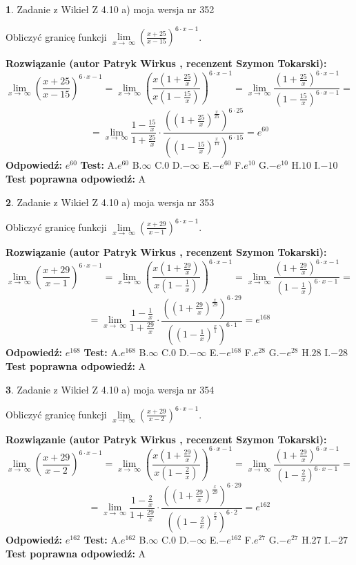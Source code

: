 \documentclass[12pt, a4paper]{article}
\theoremstyle{definition} %
\newtheorem{zad}{}
\newcommand{\zadStart}[1]{\begin{zad}#1\newline}
\newcommand{\zadStop}{\end{zad}}
\newcommand{\rozwStart}[2]{\noindent \textbf{Rozwiązanie (autor #1 , recenzent #2): }\newline}
\newcommand{\rozwStop}{\newline}
\newcommand{\odpStart}{\noindent \textbf{Odpowiedź:}\newline}
\newcommand{\odpStop}{\newline}
\newcommand{\testStart}{\noindent \textbf{Test:}\newline}
\newcommand{\testStop}{\newline}
\newcommand{\kluczStart}{\noindent \textbf{Test poprawna odpowiedź:}\newline}
\newcommand{\kluczStop}{\newline}
\begin{document}
\zadStart{Zadanie z Wikieł Z 4.10 a) moja wersja nr 352}

Obliczyć granicę funkcji  $\lim\limits_{x\to\ \infty}(\frac{x+25}{x-15})^{6\cdot x-1}$.
\zadStop
\rozwStart{Patryk Wirkus}{Szymon Tokarski}
$$\lim\limits_{x\to\ \infty}(\frac{x+25}{x-15})^{6\cdot x-1} = \lim\limits_{x\to\ \infty}(\frac{x(1+\frac{25}{x})}{x(1-\frac{15}{x})})^{6\cdot x-1}=\lim\limits_{x\to\ \infty}\frac{(1+\frac{25}{x})^{6\cdot x-1}}{(1-\frac{15}{x})^{6\cdot x-1}}=$$
$$=\lim\limits_{x\to\ \infty}\frac{1-\frac{15}{x}}{1+\frac{25}{x}}\cdot\frac{((1+\frac{25}{x})^{\frac{x}{25}})^{6\cdot25}}{((1-\frac{15}{x})^{\frac{x}{15}})^{6\cdot15}}=e^{60}$$
\rozwStop
\odpStart
$e^{60}$
\odpStop
\testStart
A.$e^{60}$ B.$\infty$ C.$0$ D.$-\infty$ E.$-e^{60}$
F.$e^{10}$ G.$-e^{10}$
H.$10$
I.$-10$
\testStop
\kluczStart
A
\kluczStop



\zadStart{Zadanie z Wikieł Z 4.10 a) moja wersja nr 353}

Obliczyć granicę funkcji  $\lim\limits_{x\to\ \infty}(\frac{x+29}{x-1})^{6\cdot x-1}$.
\zadStop
\rozwStart{Patryk Wirkus}{Szymon Tokarski}
$$\lim\limits_{x\to\ \infty}(\frac{x+29}{x-1})^{6\cdot x-1} = \lim\limits_{x\to\ \infty}(\frac{x(1+\frac{29}{x})}{x(1-\frac{1}{x})})^{6\cdot x-1}=\lim\limits_{x\to\ \infty}\frac{(1+\frac{29}{x})^{6\cdot x-1}}{(1-\frac{1}{x})^{6\cdot x-1}}=$$
$$=\lim\limits_{x\to\ \infty}\frac{1-\frac{1}{x}}{1+\frac{29}{x}}\cdot\frac{((1+\frac{29}{x})^{\frac{x}{29}})^{6\cdot29}}{((1-\frac{1}{x})^{\frac{x}{1}})^{6\cdot1}}=e^{168}$$
\rozwStop
\odpStart
$e^{168}$
\odpStop
\testStart
A.$e^{168}$ B.$\infty$ C.$0$ D.$-\infty$ E.$-e^{168}$
F.$e^{28}$ G.$-e^{28}$
H.$28$
I.$-28$
\testStop
\kluczStart
A
\kluczStop



\zadStart{Zadanie z Wikieł Z 4.10 a) moja wersja nr 354}

Obliczyć granicę funkcji  $\lim\limits_{x\to\ \infty}(\frac{x+29}{x-2})^{6\cdot x-1}$.
\zadStop
\rozwStart{Patryk Wirkus}{Szymon Tokarski}
$$\lim\limits_{x\to\ \infty}(\frac{x+29}{x-2})^{6\cdot x-1} = \lim\limits_{x\to\ \infty}(\frac{x(1+\frac{29}{x})}{x(1-\frac{2}{x})})^{6\cdot x-1}=\lim\limits_{x\to\ \infty}\frac{(1+\frac{29}{x})^{6\cdot x-1}}{(1-\frac{2}{x})^{6\cdot x-1}}=$$
$$=\lim\limits_{x\to\ \infty}\frac{1-\frac{2}{x}}{1+\frac{29}{x}}\cdot\frac{((1+\frac{29}{x})^{\frac{x}{29}})^{6\cdot29}}{((1-\frac{2}{x})^{\frac{x}{2}})^{6\cdot2}}=e^{162}$$
\rozwStop
\odpStart
$e^{162}$
\odpStop
\testStart
A.$e^{162}$ B.$\infty$ C.$0$ D.$-\infty$ E.$-e^{162}$
F.$e^{27}$ G.$-e^{27}$
H.$27$
I.$-27$
\testStop
\kluczStart
A
\kluczStop
\end{document}
